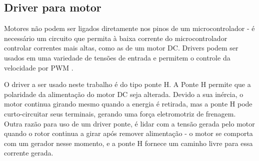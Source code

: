 \subsection{Driver para motor}

	Motores não podem ser ligados diretamente nos pinos de um microcontrolador -
	é necessário um circuito que permita à baixa corrente do microcontrolador
	controlar correntes mais altas, como as de um motor DC. Drivers podem ser
	usados em uma variedade de tensões de entrada e permitem o controle da
	velocidade por PWM \cite{toshiba_ponte_h}.

	O driver a ser usado neste trabalho é do tipo ponte H. A Ponte H permite que
	a polaridade da alimentação do motor DC seja alterada. Devido a sua inércia,
	o motor continua girando mesmo quando a energia é retirada, mas a ponte H
	pode curto-circuitar seus terminais, gerando uma força eletromotriz de
	frenagem. Outra razão para uso de um driver ponte, é lidar com a tensão
	gerada pelo motor quando o rotor continua a girar após remover
	alimentação - o motor se comporta com um gerador nesse momento, e a ponte H
	fornece um caminho livre para essa corrente gerada.


